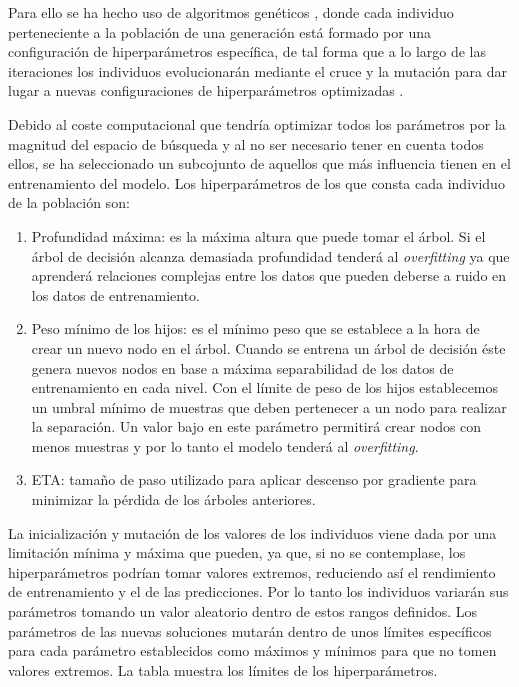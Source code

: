         Para ello se ha hecho uso de algoritmos genéticos \cite{GAXGBoostCode}, donde cada individuo perteneciente a la población de una generación está formado por una configuración de hiperparámetros específica, de tal forma que a lo largo de las iteraciones los individuos evolucionarán mediante el cruce y la mutación para dar lugar a nuevas configuraciones de hiperparámetros optimizadas \cite{GAXGBoostPaper}.

        Debido al coste computacional que tendría optimizar todos los parámetros por la magnitud del espacio de búsqueda y al no ser necesario tener en cuenta todos ellos, se ha seleccionado un subcojunto de aquellos que más influencia tienen en el entrenamiento del modelo. Los hiperparámetros de los que consta cada individuo de la población son:

        \begin{enumerate}

            \item Profundidad máxima: es la máxima altura que puede tomar el árbol. Si el árbol de decisión alcanza demasiada profundidad tenderá al \textit{overfitting} ya que aprenderá relaciones complejas entre los datos que pueden deberse a ruido en los datos de entrenamiento.

            \item Peso mínimo de los hijos: es el mínimo peso que se establece a la hora de crear un nuevo nodo en el árbol. Cuando se entrena un árbol de decisión éste genera nuevos nodos en base a máxima separabilidad de los datos de entrenamiento en cada nivel. Con el límite de peso de los hijos establecemos un umbral mínimo de muestras que deben pertenecer a un nodo para realizar la separación. Un valor bajo en este parámetro permitirá crear nodos con menos muestras y por lo tanto el modelo tenderá al \textit{overfitting}.

            \item ETA: tamaño de paso utilizado para aplicar descenso por gradiente para minimizar la pérdida de los árboles anteriores.

        \end{enumerate}

        La inicialización y mutación de los valores de los individuos viene dada por una limitación mínima y máxima que pueden, ya que, si no se contemplase, los hiperparámetros podrían tomar valores extremos, reduciendo así el rendimiento de entrenamiento y el de las predicciones. Por lo tanto los individuos variarán sus parámetros tomando un valor aleatorio dentro de estos rangos definidos.  Los parámetros de las nuevas soluciones mutarán dentro de unos límites específicos para cada parámetro establecidos como máximos y mínimos para que no tomen valores extremos. La tabla \cite{InitAndMutationLimitsHyperparamsTable} muestra los límites de los hiperparámetros.

